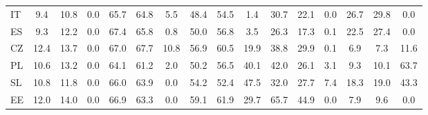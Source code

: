\begin{table}[htbp]
\begin{tabular}{lccccccccccccccc}
IT &       9.4 &      10.8 &       0.0 &      65.7 &      64.8 &       5.5 &      48.4 &      54.5 &       1.4 &      30.7 &      22.1 &       0.0 &      26.7 &      29.8 &       0.0 \\  
ES &       9.3 &      12.2 &       0.0 &      67.4 &      65.8 &       0.8 &      50.0 &      56.8 &       3.5 &      26.3 &      17.3 &       0.1 &      22.5 &      27.4 &       0.0 \\  
CZ &      12.4 &      13.7 &       0.0 &      67.0 &      67.7 &      10.8 &      56.9 &      60.5 &      19.9 &      38.8 &      29.9 &       0.1 &       6.9 &       7.3 &      11.6 \\  
PL &      10.6 &      13.2 &       0.0 &      64.1 &      61.2 &       2.0 &      50.2 &      56.5 &      40.1 &      42.0 &      26.1 &       3.1 &       9.3 &      10.1 &      63.7 \\  
SL &      10.8 &      11.8 &       0.0 &      66.0 &      63.9 &       0.0 &      54.2 &      52.4 &      47.5 &      32.0 &      27.7 &       7.4 &      18.3 &      19.0 &      43.3 \\  
EE &      12.0 &      14.0 &       0.0 &      66.9 &      63.3 &       0.0 &      59.1 &      61.9 &      29.7 &      65.7 &      44.9 &       0.0 &       7.9 &       9.6 &       0.0 \\  
\hline \hline \end{tabular}
\end{table}
